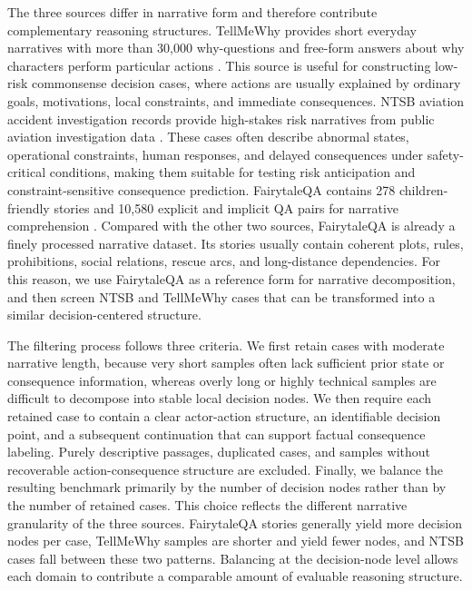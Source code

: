\documentclass[pdflatex,sn-mathphys-num]{sn-jnl}%
\theoremstyle{thmstyleone}%
\theoremstyle{thmstyletwo}%
\theoremstyle{thmstylethree}%
\begin{document}
The three sources differ in narrative form and therefore contribute complementary reasoning structures. TellMeWhy provides short everyday narratives with more than 30,000 why-questions and free-form answers about why characters perform particular actions \cite{lal2021tellmewhy}. This source is useful for constructing low-risk commonsense decision cases, where actions are usually explained by ordinary goals, motivations, local constraints, and immediate consequences. NTSB aviation accident investigation records provide high-stakes risk narratives from public aviation investigation data \cite{ntsbCarol}. These cases often describe abnormal states, operational constraints, human responses, and delayed consequences under safety-critical conditions, making them suitable for testing risk anticipation and constraint-sensitive consequence prediction. FairytaleQA contains 278 children-friendly stories and 10,580 explicit and implicit QA pairs for narrative comprehension \cite{xu2022fantastic}. Compared with the other two sources, FairytaleQA is already a finely processed narrative dataset. Its stories usually contain coherent plots, rules, prohibitions, social relations, rescue arcs, and long-distance dependencies. For this reason, we use FairytaleQA as a reference form for narrative decomposition, and then screen NTSB and TellMeWhy cases that can be transformed into a similar decision-centered structure.

The filtering process follows three criteria. We first retain cases with moderate narrative length, because very short samples often lack sufficient prior state or consequence information, whereas overly long or highly technical samples are difficult to decompose into stable local decision nodes. We then require each retained case to contain a clear actor-action structure, an identifiable decision point, and a subsequent continuation that can support factual consequence labeling. Purely descriptive passages, duplicated cases, and samples without recoverable action-consequence structure are excluded. Finally, we balance the resulting benchmark primarily by the number of decision nodes rather than by the number of retained cases. This choice reflects the different narrative granularity of the three sources. FairytaleQA stories generally yield more decision nodes per case, TellMeWhy samples are shorter and yield fewer nodes, and NTSB cases fall between these two patterns. Balancing at the decision-node level allows each domain to contribute a comparable amount of evaluable reasoning structure.
\end{document}
